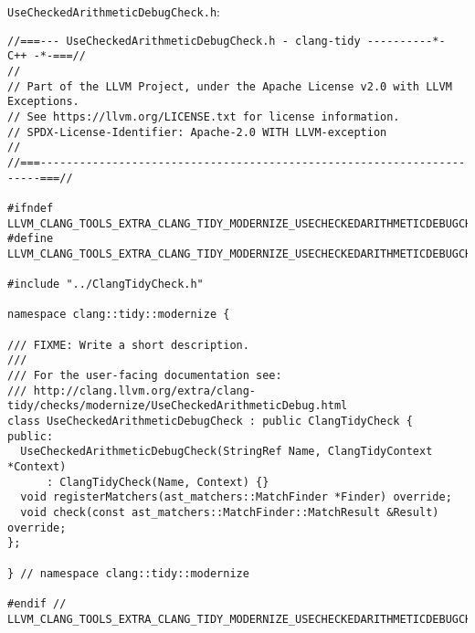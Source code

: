 \texttt{UseCheckedArithmeticDebugCheck.h}:
{\scriptsize
\begin{verbatim}
//===--- UseCheckedArithmeticDebugCheck.h - clang-tidy ----------*- C++ -*-===//
//
// Part of the LLVM Project, under the Apache License v2.0 with LLVM Exceptions.
// See https://llvm.org/LICENSE.txt for license information.
// SPDX-License-Identifier: Apache-2.0 WITH LLVM-exception
//
//===----------------------------------------------------------------------===//

#ifndef LLVM_CLANG_TOOLS_EXTRA_CLANG_TIDY_MODERNIZE_USECHECKEDARITHMETICDEBUGCHECK_H
#define LLVM_CLANG_TOOLS_EXTRA_CLANG_TIDY_MODERNIZE_USECHECKEDARITHMETICDEBUGCHECK_H

#include "../ClangTidyCheck.h"

namespace clang::tidy::modernize {

/// FIXME: Write a short description.
///
/// For the user-facing documentation see:
/// http://clang.llvm.org/extra/clang-tidy/checks/modernize/UseCheckedArithmeticDebug.html
class UseCheckedArithmeticDebugCheck : public ClangTidyCheck {
public:
  UseCheckedArithmeticDebugCheck(StringRef Name, ClangTidyContext *Context)
      : ClangTidyCheck(Name, Context) {}
  void registerMatchers(ast_matchers::MatchFinder *Finder) override;
  void check(const ast_matchers::MatchFinder::MatchResult &Result) override;
};

} // namespace clang::tidy::modernize

#endif // LLVM_CLANG_TOOLS_EXTRA_CLANG_TIDY_MODERNIZE_USECHECKEDARITHMETICDEBUGCHECK_H

\end{verbatim}

}

